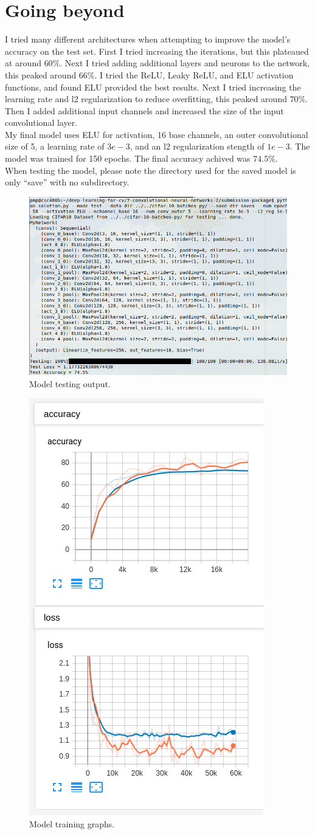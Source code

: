 \documentclass[12pt, letter]{article}
\begin{document}
\section{Going beyond}
I tried many different architectures when attempting to improve the model's
accuracy on the test set. First I tried increasing the iterations, but this
plateaued at around $60\%$. Next I tried adding additional layers and neurons to
the network, this peaked around $66\%$. I tried the ReLU, Leaky ReLU, and ELU
activation functions, and found ELU provided the best results. Next I tried
increasing the learning rate and l2 regularization to reduce overfitting, this
peaked around $70\%$. Then I added additional input channels and increased the
size of the input convolutional layer. \\
My final model uses ELU for activation, 16 base channels, an outer convolutional
size of 5, a learning rate of $3e-3$, and an l2 regularization stength of
$1e-3$. The model was trained for 150 epochs. The final accuracy achived was
$74.5\%$. \\
When testing the model, please note the directory used for the saved
model is only ``save'' with no subdirectory.
\begin{figure}[!ht]
  \centering
  \includegraphics[width=0.8 \textwidth]{result.png}
  \caption{Model testing output.}
  \label{fig:eg}
\end{figure}
\begin{figure}[!ht]
  \centering
  \includegraphics[width=0.6 \textwidth]{graph.png}
  \caption{Model training graphs.}
  \label{fig:eg}
\end{figure}
\end{document}
